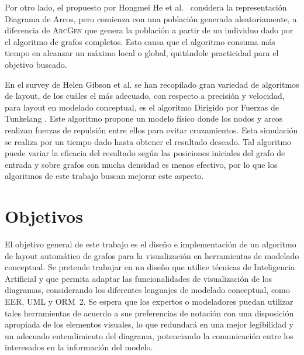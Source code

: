 	Por otro lado, el propuesto por Hongmei He et al. \cite{he2007parallelisation}\ considera la representación  Diagrama de Arcos, pero comienza con una población generada aleatoriamente, a diferencia de \textsc{ArcGen} que genera la población a partir de un individuo dado por el algoritmo de grafos completos. Esto causa que el algoritmo consuma más tiempo en alcanzar un máximo local o global, quitándole practicidad para el objetivo buscado.
	
	En el survey de Helen Gibson et al. \cite{gibson2013survey} se han recopilado gran variedad de algoritmos de layout, de los cuáles el más adecuado, con respecto a precisión y velocidad, para layout en modelado conceptual, es el algoritmo Dirigido por Fuerzas de Tunkelang \cite{tunkelang1998jiggle}. Este algoritmo  propone un modelo físico donde los nodos y arcos realizan fuerzas de repulsión entre ellos para evitar cruzamientos. Esta simulación se realiza por un tiempo dado hasta obtener el resultado deseado. Tal algoritmo puede variar la eficacia del resultado según las posiciones iniciales del grafo de entrada y sobre grafos con mucha densidad es menos efectivo, por lo que los algoritmos de este trabajo buscan mejorar este aspecto. %
	

\section{Objetivos }
El objetivo general de este trabajo es el diseño e implementación  de un algoritmo de layout automático de grafos para la visualización en herramientas de modelado conceptual. Se pretende trabajar en un diseño que utilice técnicas de Inteligencia Artificial y que  permita adaptar las funcionalidades de visualización de los diagramas, considerando los diferentes lenguajes de modelado conceptual, como EER, UML y \mbox{ORM 2.}
Se espera que los expertos o modeladores puedan utilizar tales herramientas de acuerdo a sus preferencias de notación con una disposición apropiada de los elementos visuales, lo que redundará en una mejor legibilidad y un adecuado entendimiento del diagrama, potenciando la comunicación entre los interesados en la información del modelo.


